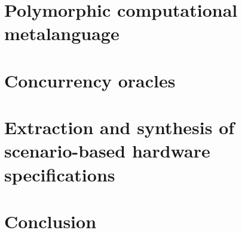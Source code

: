 \documentclass{llncs}
\begin{document}
\section{Polymorphic computational metalanguage\label{sec:metalanguage}}


\section{Concurrency oracles\label{sec:oracles}}


\section{Extraction and synthesis of scenario-based hardware specifications\label{sec:scenarios}}


\section{Conclusion}

%
%
%

\end{document}
